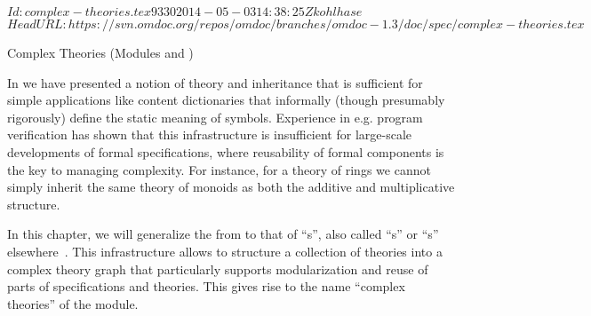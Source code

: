 \svnInfo $Id: complex-theories.tex 9330 2014-05-03 14:38:25Z kohlhase $
\svnKeyword $HeadURL: https://svn.omdoc.org/repos/omdoc/branches/omdoc-1.3/doc/spec/complex-theories.tex $

\begin{tchapter}[id=complex-theories,short=Complex Theories]{Complex Theories (Modules
    {} and {})}

  In {} we have presented a notion of theory and inheritance
  that is sufficient for simple applications like content dictionaries that informally
  (though presumably rigorously) define the static meaning of symbols. Experience in
  e.g. program verification has shown that this infrastructure is insufficient for
  large-scale developments of formal specifications, where reusability of formal
  components is the key to managing complexity. For instance, for a theory of rings we
  cannot simply inherit the same theory of monoids as both the additive and multiplicative
  structure.

  In this chapter, we will generalize the {} from
  {} to that of ``{s}'', also called
  ``{s}'' or ``{s}''
  elsewhere~\cite{Farmer93}.  This infrastructure allows to structure a collection of
  theories into a complex theory graph that particularly supports modularization and reuse
  of parts of specifications and theories. This gives rise to the name ``complex
  theories'' of the {\omdoc} module.


\end{tchapter}
